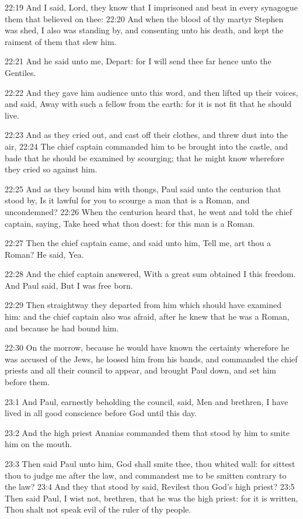 22:19 And I said, Lord, they know that I imprisoned and beat in every
synagogue them that believed on thee: 22:20 And when the blood of thy
martyr Stephen was shed, I also was standing by, and consenting unto
his death, and kept the raiment of them that slew him.

22:21 And he said unto me, Depart: for I will send thee far hence unto
the Gentiles.

22:22 And they gave him audience unto this word, and then lifted up
their voices, and said, Away with such a fellow from the earth: for it
is not fit that he should live.

22:23 And as they cried out, and cast off their clothes, and threw
dust into the air, 22:24 The chief captain commanded him to be brought
into the castle, and bade that he should be examined by scourging;
that he might know wherefore they cried so against him.

22:25 And as they bound him with thongs, Paul said unto the centurion
that stood by, Is it lawful for you to scourge a man that is a Roman,
and uncondemned?  22:26 When the centurion heard that, he went and
told the chief captain, saying, Take heed what thou doest: for this
man is a Roman.

22:27 Then the chief captain came, and said unto him, Tell me, art
thou a Roman? He said, Yea.

22:28 And the chief captain answered, With a great sum obtained I this
freedom. And Paul said, But I was free born.

22:29 Then straightway they departed from him which should have
examined him: and the chief captain also was afraid, after he knew
that he was a Roman, and because he had bound him.

22:30 On the morrow, because he would have known the certainty
wherefore he was accused of the Jews, he loosed him from his bands,
and commanded the chief priests and all their council to appear, and
brought Paul down, and set him before them.

23:1 And Paul, earnestly beholding the council, said, Men and
brethren, I have lived in all good conscience before God until this
day.

23:2 And the high priest Ananias commanded them that stood by him to
smite him on the mouth.

23:3 Then said Paul unto him, God shall smite thee, thou whited wall:
for sittest thou to judge me after the law, and commandest me to be
smitten contrary to the law?  23:4 And they that stood by said,
Revilest thou God's high priest?  23:5 Then said Paul, I wist not,
brethren, that he was the high priest: for it is written, Thou shalt
not speak evil of the ruler of thy people.

